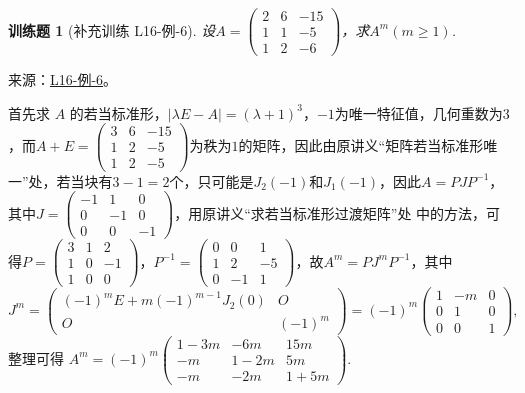 \documentclass[12pt,fontset=fandol]{ctexart}
\newtheorem{exercise}{训练题}[section]
\begin{document}
\begin{exercise}[补充训练 L16-例-6]\label{prob:L16-例-6}
设$A=\begin{pmatrix}
            2 & 6 & -15 \\ 1 & 1 & -5 \\ 1 & 2 & -6
        \end{pmatrix}$，求$A^{m}(m\geqslant 1)$.
\end{exercise}
\noindent 来源：\href{https://github.com/yhwu-is/Linear-Algebra-Left-Undone/blob/new/%E8%AE%B2%E4%B9%89/%E4%B8%93%E9%A2%98/16%20%E8%8B%A5%E5%BD%93%E6%A0%87%E5%87%86%E5%BD%A2.tex}{L16-例-6}。
\begin{solve}
首先求 $A$ 的若当标准形，$|\lambda E - A|=(\lambda + 1)^3$，$-1$为唯一特征值，几何重数为$3$，而$A+E=\begin{pmatrix}
            3 & 6 & -15 \\ 1 & 2 & -5 \\ 1 & 2 & -5
        \end{pmatrix}$为秩为$1$的矩阵，因此由原讲义“矩阵若当标准形唯一”处，若当块有$3-1=2$个，只可能是$J_2(-1)$和$J_1(-1)$，因此$A=PJP^{-1}$，其中$J=\begin{pmatrix}
            -1 & 1 & 0 \\ 0 & -1 & 0 \\ 0 & 0 & -1
        \end{pmatrix}$，用原讲义“求若当标准形过渡矩阵”处 中的方法，可得$P=\begin{pmatrix}
            3 & 1 & 2 \\ 1 & 0 & -1 \\ 1 & 0 & 0
        \end{pmatrix}$，$P^{-1}=\begin{pmatrix}
            0 & 0 & 1 \\ 1 & 2 & -5 \\ 0 & -1 & 1
        \end{pmatrix}$，故$A^m=PJ^mP^{-1}$，其中
        \[
            J^m=\begin{pmatrix}
                (-1)^m E + m(-1)^{m-1}J_2(0) & O \\ O & (-1)^m
            \end{pmatrix}=(-1)^m\begin{pmatrix}
                1 & -m & 0 \\ 0 & 1 & 0 \\ 0 & 0 & 1
            \end{pmatrix},
        \]
        整理可得 $A^m=(-1)^m\begin{pmatrix}
            1-3m & -6m & 15m \\ -m & 1-2m & 5m \\ -m & -2m & 1+5m
        \end{pmatrix}$.
\end{solve}
\end{document}
